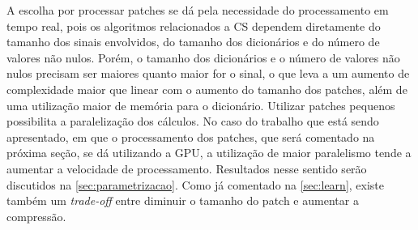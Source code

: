 \documentclass[cic,tc]{iiufrgs}
\begin{document}
A escolha por processar patches se dá pela necessidade do processamento em tempo real, pois 
os algoritmos relacionados a CS dependem diretamente do tamanho
dos sinais envolvidos, do tamanho dos dicionários e do número de valores não nulos.
Porém, o tamanho dos dicionários e o número de valores não nulos precisam ser maiores quanto maior for 
o sinal, o que leva a um aumento de complexidade maior que linear com o aumento do tamanho dos
patches, além de uma utilização maior de memória para o dicionário.
Utilizar patches pequenos possibilita a paralelização dos cálculos.
No caso do trabalho que está sendo apresentado, em que o processamento dos patches, que será 
comentado na próxima seção, se dá utilizando a GPU, a utilização de maior 
paralelismo tende a aumentar a velocidade de processamento.
Resultados nesse sentido serão discutidos na \autoref{sec:parametrizacao}.
Como já comentado na \autoref{sec:learn}, existe também um \textit{trade-off} entre 
diminuir o tamanho do patch e aumentar a compressão.
\end{document}

